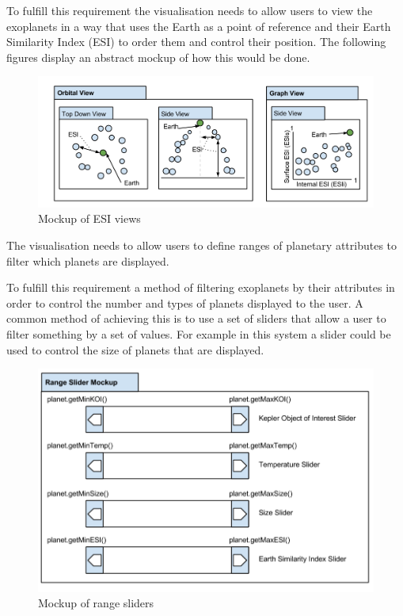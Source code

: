 \begin{enumerate}
To fulfill this requirement the visualisation needs to allow users to view the
exoplanets in a way that uses the Earth as a point of reference and their Earth
Similarity Index (ESI) to order them and control their position. The following
figures display an abstract mockup of how this would be done.

\begin{figure}[H]
  \centering
      \includegraphics[width=1\textwidth]{images/mockupESI.png}
  \caption{Mockup of ESI views}  
\end{figure}

\clearpage
{\bf
 \item[R4.] The visualisation needs to allow users to define ranges of planetary
attributes to filter which planets are displayed.}

To fulfill this requirement a method of filtering exoplanets by their attributes
in order to control the number and types of planets displayed to the user. A
common method of achieving this is to use a set of sliders that allow a user to
filter something by a set of values. For example in this system a slider could
be used to control the size of planets that are displayed.

\begin{figure}[H]
  \centering
      \includegraphics[width=.8\textwidth]{images/mockSlider.png}
  \caption{Mockup of range sliders}  
\end{figure}


\end{enumerate}
